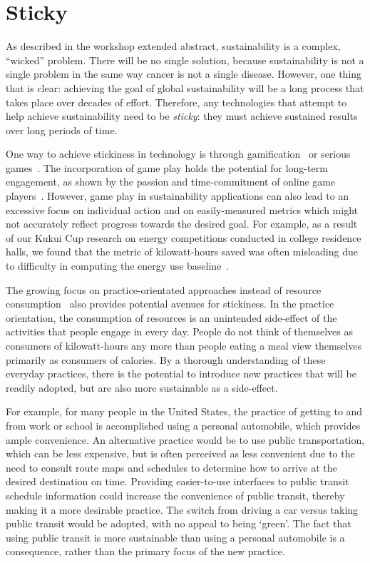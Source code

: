 \documentclass{sigchi}
\begin{document}
\section{Sticky}

As described in the workshop extended abstract, sustainability is a complex, ``wicked'' problem. There will be no single solution, because sustainability is not a single problem in the same way cancer is not a single disease. However, one thing that is clear: achieving the goal of global sustainability will be a long process that takes place over decades of effort. Therefore, any technologies that attempt to help achieve sustainability need to be \emph{sticky}: they must achieve sustained results over long periods of time.

One way to achieve stickiness in technology is through gamification~\cite{Deterding-2011b} or serious games~\cite{csdl2-13-05}. The incorporation of game play holds the potential for long-term engagement, as shown by the passion and time-commitment of online game players~\cite{mcgonigal2011reality}. However, game play in sustainability applications can also lead to an excessive focus on individual action and on easily-measured metrics which might not accurately reflect progress towards the desired goal. For example, as a result of our Kukui Cup research on energy competitions conducted in college residence halls, we found that the metric of kilowatt-hours saved was often misleading due to difficulty in computing the energy use baseline~\cite{csdl2-12-08}. 

The growing focus on practice-orientated approaches instead of resource consumption~\cite{Pierce2013Practice,Strengers2011} also provides potential avenues for stickiness. In the practice orientation, the consumption of resources is an unintended side-effect of the activities that people engage in every day. People do not think of themselves as consumers of kilowatt-hours any more than people eating a meal view themselves primarily as consumers of calories. By a thorough understanding of these everyday practices, there is the potential to introduce new practices that will be readily adopted, but are also more sustainable as a side-effect.

For example, for many people in the United States, the practice of getting to and from work or school is accomplished using a personal automobile, which provides ample convenience. An alternative practice would be to use public transportation, which can be less expensive, but is often perceived as less convenient due to the need to consult route maps and schedules to determine how to arrive at the desired destination on time. Providing easier-to-use interfaces to public transit schedule information could increase the convenience of public transit, thereby making it a more desirable practice. The switch from driving a car versus taking public transit would be adopted, with no appeal to being `green'. The fact that using public transit is more sustainable than using a personal automobile is a consequence, rather than the primary focus of the new practice.
\end{document}
